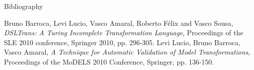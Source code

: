 \documentclass[final,hyperref={pdfpagelabels=false}]{beamer}
\begin{document}
\begin{frame}{}
\begin{columns}[t]
\begin{column}{.385\linewidth}
             \begin{block}{Bibliography}
             \small
     	   \begin{thebibliography}{10} 
     	    Bruno Barroca, Levi Lucio, Vasco Amaral, Roberto
     	   F{\'e}lix and Vasco Sousa, {\em DSLTrans: A Turing Incomplete
     	   Transformation Language}, Proceedings of the SLE 2010 conference,
     	   Springer 2010, pp. 296-305.
     	    Levi Lucio, Bruno Barroca, Vasco Amaral, {\em A
     	   Technique for Automatic Validation of Model Transformations},
     	   Proceedings of the MoDELS 2010 Conference, Springer, pp. 136-150.
          		\end{thebibliography}	   
              	\end{block}
                     
                     
           \end{column}

    \end{columns}

  \end{frame}
\end{document}
